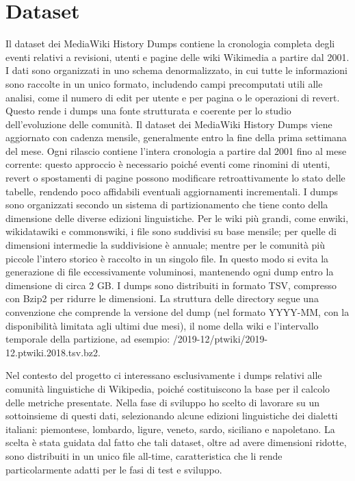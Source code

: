\section{Dataset}
\label{sec:dataset}
Il dataset dei MediaWiki History Dumps contiene la cronologia completa degli eventi relativi a revisioni, utenti e pagine delle wiki Wikimedia a partire dal 2001. I dati sono organizzati in uno schema denormalizzato, in cui tutte le informazioni sono raccolte in un unico formato, includendo campi precomputati utili alle analisi, come il numero di edit per utente e per pagina o le operazioni di revert. Questo rende i dumps una fonte strutturata e coerente per lo studio dell’evoluzione delle comunità.
Il dataset dei MediaWiki History Dumps viene aggiornato con cadenza mensile, generalmente entro la fine della prima settimana del mese. Ogni rilascio contiene l’intera cronologia a partire dal 2001 fino al mese corrente: questo approccio è necessario poiché eventi come rinomini di utenti, revert o spostamenti di pagine possono modificare retroattivamente lo stato delle tabelle, rendendo poco affidabili eventuali aggiornamenti incrementali.
I dumps sono organizzati secondo un sistema di partizionamento che tiene conto della dimensione delle diverse edizioni linguistiche. Per le wiki più grandi, come enwiki, wikidatawiki e commonswiki, i file sono suddivisi su base mensile; per quelle di dimensioni intermedie la suddivisione è annuale; mentre per le comunità più piccole l’intero storico è raccolto in un singolo file. In questo modo si evita la generazione di file eccessivamente voluminosi, mantenendo ogni dump entro la dimensione di circa 2 GB.
I dumps sono distribuiti in formato TSV, compresso con Bzip2 per ridurre le dimensioni.
La struttura delle directory segue una convenzione che comprende la versione del dump (nel formato YYYY-MM, con la disponibilità limitata agli ultimi due mesi), il nome della wiki e l’intervallo temporale della partizione, ad esempio: /2019-12/ptwiki/2019-12.ptwiki.2018.tsv.bz2.

Nel contesto del progetto ci interessano esclusivamente i dumps relativi alle comunità linguistiche di Wikipedia, poiché costituiscono la base per il calcolo delle metriche presentate. Nella fase di sviluppo ho scelto di lavorare su un sottoinsieme di questi dati, selezionando alcune edizioni linguistiche dei dialetti italiani: piemontese, lombardo, ligure, veneto, sardo, siciliano e napoletano. La scelta è stata guidata dal fatto che tali dataset, oltre ad avere dimensioni ridotte, sono distribuiti in un unico file all-time, caratteristica che li rende particolarmente adatti per le fasi di test e sviluppo.

